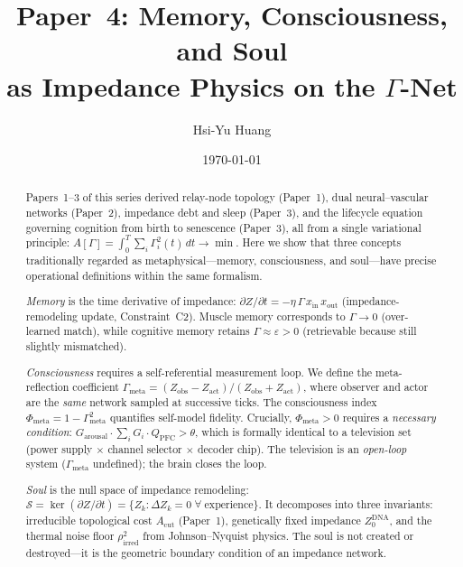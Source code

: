 \documentclass[aps,pre,twocolumn,superscriptaddress,floatfix]{revtex4-2}
\newcommand{\Gmeta}{\Gamma_{\text{meta}}}
\newcommand{\Phimeta}{\Phi_{\text{meta}}}
\newcommand{\Zarousal}{G_{\text{arousal}}}
\newcommand{\QPFC}{Q_{\text{PFC}}}
\newcommand{\Acut}{A_{\text{cut}}}
\begin{document}
\title{Paper~4: Memory, Consciousness, and Soul\\
as Impedance Physics on the $\Gamma$-Net}

\author{Hsi-Yu Huang}

\date{\today}

\begin{abstract}
Papers~1--3 of this series derived relay-node topology
(Paper~1), dual neural--vascular networks (Paper~2),
impedance debt and sleep (Paper~3), and the lifecycle
equation governing cognition from birth to senescence
(Paper~3), all from a single variational principle:
$A[\Gamma]=\int_0^T\!\sum_i\Gamma_i^2(t)\,dt\to\min$.
Here we show that three concepts traditionally regarded as
metaphysical---memory, consciousness, and soul---have
precise operational definitions within the same formalism.

\emph{Memory} is the time derivative of impedance:
$\partial Z/\partial t=-\eta\,\Gamma\,x_{\text{in}}\,x_{\text{out}}$
(impedance-remodeling update, Constraint~C2).
Muscle memory corresponds to $\Gamma\to 0$ (over-learned match),
while cognitive memory retains $\Gamma\approx\varepsilon>0$
(retrievable because still slightly mismatched).

\emph{Consciousness} requires a self-referential measurement
loop.  We define the meta-reflection coefficient
$\Gmeta=(Z_{\text{obs}}-Z_{\text{act}})/(Z_{\text{obs}}+Z_{\text{act}})$,
where observer and actor are the \emph{same} network sampled at
successive ticks.  The consciousness index
$\Phimeta=1-\Gmeta^2$ quantifies self-model fidelity.
Crucially, $\Phimeta>0$ requires a \emph{necessary condition}:
$\Zarousal\cdot\sum_i G_i\cdot\QPFC>\theta$,
which is formally identical to a television set
(power supply $\times$ channel selector $\times$ decoder chip).
The television is an \emph{open-loop} system ($\Gmeta$ undefined);
the brain closes the loop.

\emph{Soul} is the null space of impedance remodeling:
$\mathcal{S}=\ker(\partial Z/\partial t)
=\{Z_k:\Delta Z_k=0\;\forall\;\text{experience}\}$.
It decomposes into three invariants:
irreducible topological cost $\Acut$ (Paper~1),
genetically fixed impedance $Z_0^{\text{DNA}}$, and
the thermal noise floor $\rho_{\text{irred}}^2$ from
Johnson--Nyquist physics.
The soul is not created or destroyed---it is the geometric
boundary condition of an impedance network.


\end{abstract}
\end{document}
